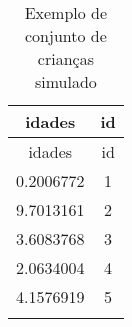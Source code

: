 \documentclass[]{book}
\begin{document}
\begin{longtable}[]{@{}cc@{}}
\caption{Exemplo de conjunto de crianças simulado}\tabularnewline
\toprule
\begin{minipage}[b]{0.13\columnwidth}\centering\strut
idades
\strut\end{minipage} &
\begin{minipage}[b]{0.05\columnwidth}\centering\strut
id
\strut\end{minipage}\tabularnewline
\midrule
\endfirsthead
\toprule
\begin{minipage}[b]{0.13\columnwidth}\centering\strut
idades
\strut\end{minipage} &
\begin{minipage}[b]{0.05\columnwidth}\centering\strut
id
\strut\end{minipage}\tabularnewline
\midrule
\endhead
\begin{minipage}[t]{0.13\columnwidth}\centering\strut
0.2006772
\strut\end{minipage} &
\begin{minipage}[t]{0.05\columnwidth}\centering\strut
1
\strut\end{minipage}\tabularnewline
\begin{minipage}[t]{0.13\columnwidth}\centering\strut
9.7013161
\strut\end{minipage} &
\begin{minipage}[t]{0.05\columnwidth}\centering\strut
2
\strut\end{minipage}\tabularnewline
\begin{minipage}[t]{0.13\columnwidth}\centering\strut
3.6083768
\strut\end{minipage} &
\begin{minipage}[t]{0.05\columnwidth}\centering\strut
3
\strut\end{minipage}\tabularnewline
\begin{minipage}[t]{0.13\columnwidth}\centering\strut
2.0634004
\strut\end{minipage} &
\begin{minipage}[t]{0.05\columnwidth}\centering\strut
4
\strut\end{minipage}\tabularnewline
\begin{minipage}[t]{0.13\columnwidth}\centering\strut
4.1576919
\strut\end{minipage} &
\begin{minipage}[t]{0.05\columnwidth}\centering\strut
5
\strut\end{minipage}\tabularnewline
\begin{minipage}[t]{0.13\columnwidth}\centering\strut

\end{minipage}
\end{longtable}
\end{document}
